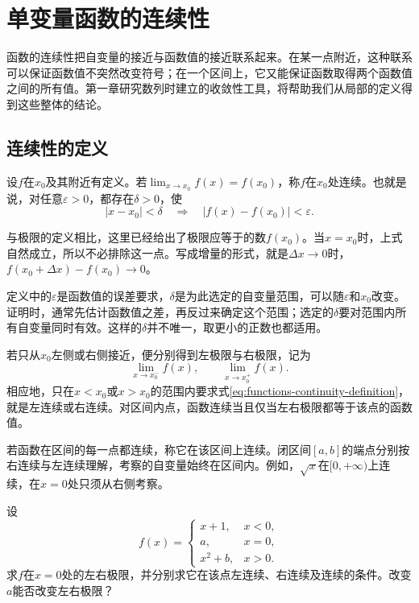 \newpage
\section{单变量函数的连续性}
\label{sec:functions-continuity}

函数的连续性把自变量的接近与函数值的接近联系起来。在某一点附近，这种联系可以保证函数值不突然改变符号；在一个区间上，它又能保证函数取得两个函数值之间的所有值。第一章研究数列时建立的收敛性工具，将帮助我们从局部的定义得到这些整体的结论。

\subsection{连续性的定义}
\label{subsec:functions-continuity-definition}

\begin{definition}
设\(f\)在\(x_0\)及其附近有定义。若\(\lim_{x\to x_0}f(x)=f(x_0)\)，称\(f\)在\(x_0\)处{\heiti{}连续}。也就是说，对任意\(\varepsilon>0\)，都存在\(\delta>0\)，使
\begin{equation}\label{eq:functions-continuity-definition}
 |x-x_0|<\delta\quad\Longrightarrow\quad|f(x)-f(x_0)|<\varepsilon.
\end{equation}
\end{definition}

与极限的定义相比，这里已经给出了极限应等于的数\(f(x_0)\)。当\(x=x_0\)时，上式自然成立，所以不必排除这一点。写成增量的形式，就是\(\Delta x\to0\)时，\(f(x_0+\Delta x)-f(x_0)\to0\)。

定义中的\(\varepsilon\)是函数值的误差要求，\(\delta\)是为此选定的自变量范围，可以随\(\varepsilon\)和\(x_0\)改变。证明时，通常先估计函数值之差，再反过来确定这个范围；选定的\(\delta\)要对范围内所有自变量同时有效。这样的\(\delta\)并不唯一，取更小的正数也都适用。

若只从\(x_0\)左侧或右侧接近，便分别得到{\heiti{}左极限}与{\heiti{}右极限}，记为
\begin{equation*}
 \lim_{x\to x_0^-}f(x),\qquad \lim_{x\to x_0^+}f(x).
\end{equation*}
相应地，只在\(x<x_0\)或\(x>x_0\)的范围内要求式\eqref{eq:functions-continuity-definition}，就是左连续或右连续。对区间内点，函数连续当且仅当左右极限都等于该点的函数值。

若函数在区间的每一点都连续，称它在该区间上连续。闭区间\([a,b]\)的端点分别按右连续与左连续理解，考察的自变量始终在区间内。例如，\(\sqrt x\)在\([0,+\infty)\)上连续，在\(x=0\)处只须从右侧考察。

\begin{example}
设
\begin{equation*}
 f(x)=\begin{cases}
 x+1,&x<0,\\
 a,&x=0,\\
 x^2+b,&x>0.
 \end{cases}
\end{equation*}
求\(f\)在\(x=0\)处的左右极限，并分别求它在该点左连续、右连续及连续的条件。改变\(a\)能否改变左右极限？
\end{example}

